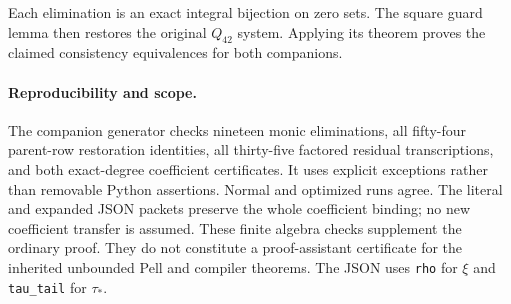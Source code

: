 Each elimination is an exact integral bijection on zero sets. The square
guard lemma then restores the original $Q_{42}$ system. Applying its
theorem proves the claimed consistency equivalences for both companions.

\paragraph{Reproducibility and scope.}
The companion generator checks nineteen monic eliminations, all fifty-four
parent-row restoration identities, all thirty-five factored residual
transcriptions, and both exact-degree coefficient certificates. It uses
explicit exceptions rather than removable Python assertions. Normal and
optimized runs agree. The literal and expanded JSON packets preserve the
whole coefficient binding; no new coefficient transfer is assumed.
These finite algebra checks supplement the ordinary proof. They do not
constitute a proof-assistant certificate for the inherited unbounded
Pell and compiler theorems. The JSON uses \texttt{rho} for $\xi$ and
\texttt{tau\_tail} for $\tau_*$.
